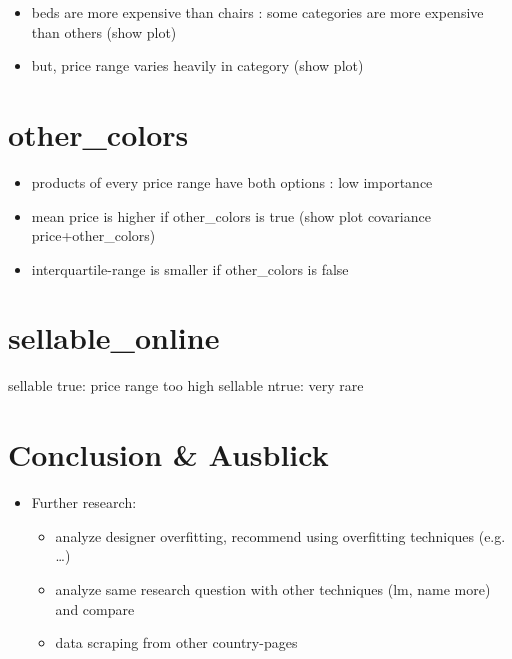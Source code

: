 \documentclass[a4paper, nobind]{templates/ociamthesis}
\providecommand{\tightlist}{%
  \setlength{\itemsep}{0pt}\setlength{\parskip}{0pt}}
\begin{document}
\begin{itemize}
\tightlist
\item
  beds are more expensive than chairs : some categories are more expensive than others (show plot)
\item
  but, price range varies heavily in category (show plot)
\end{itemize}

\hypertarget{other_colors}{%
\section{other\_colors}\label{other_colors}}

\begin{itemize}
\tightlist
\item
  products of every price range have both options : low importance
\item
  mean price is higher if other\_colors is true (show plot covariance price+other\_colors)
\item
  interquartile-range is smaller if other\_colors is false
\end{itemize}

\hypertarget{sellable_online}{%
\section{sellable\_online}\label{sellable_online}}

sellable true: price range too high
sellable ntrue: very rare

\hypertarget{conclusion-ausblick}{%
\section{Conclusion \& Ausblick}\label{conclusion-ausblick}}

\begin{itemize}
\tightlist
\item
  Further research:

  \begin{itemize}
  \tightlist
  \item
    analyze designer overfitting, recommend using overfitting techniques (e.g. \ldots{})
  \item
    analyze same research question with other techniques (lm, name more) and compare
  \item
    data scraping from other country-pages
  \end{itemize}
\end{itemize}
\end{document}

